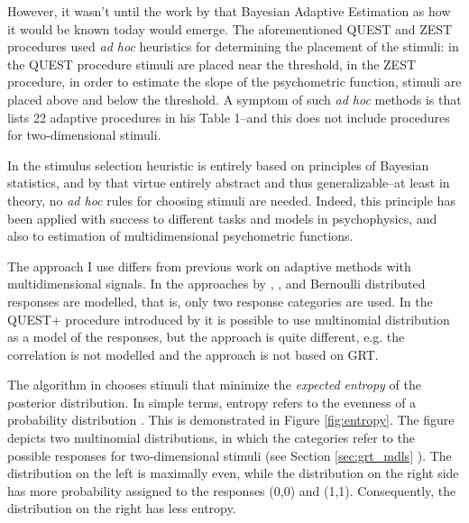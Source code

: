 \documentclass{article}\usepackage{knitr}
\begin{document}
However, it wasn't until the work by \citet{kontsevichtyler1999} that Bayesian Adaptive Estimation as how it would be known today would emerge. The aforementioned QUEST and ZEST procedures used \textit{ad hoc} heuristics for determining the placement of the stimuli: in the QUEST procedure stimuli are placed near the threshold, in the ZEST procedure, in order to estimate the slope of the psychometric function, stimuli are placed above and below the threshold. A symptom of such \textit{ad hoc} methods is that \citet{treutwein1995} lists 22 adaptive procedures in his Table 1--and this does not include procedures for two-dimensional stimuli.

In \citet{kontsevichtyler1999} the stimulus selection heuristic is entirely based on principles of Bayesian statistics, and by that virtue entirely abstract and thus generalizable--at least in theory, no \textit{ad hoc} rules for choosing stimuli are needed. Indeed, this principle has been applied with success to different tasks and models in psychophysics, and also to estimation of multidimensional psychometric functions. 

The approach I use differs from previous work on adaptive methods with multidimensional signals. In the approaches by \citet{dimattina2015}, \citet{lesmes2006}, \citet{shen2013, shen2014} and \citet{kujalalukka2006} Bernoulli distributed responses are modelled, that is, only two response categories are used. In the QUEST+ procedure introduced by \citet{watson2017} it is possible to use multinomial distribution as a model of the responses, but the approach is quite different, e.g. the correlation is not modelled and the approach is not based on GRT.

The algorithm in \citet{kontsevichtyler1999} chooses stimuli that minimize the \textit{expected entropy} of the posterior distribution. In simple terms, entropy refers to the evenness of a probability distribution \citep[p. 365]{kruschke2015}. This is demonstrated in Figure \ref{fig:entropy}. The figure depicts two multinomial distributions, in which the categories refer to the possible responses for two-dimensional stimuli (see Section \ref{sec:grt_mdls} \textit{}). The distribution on the left is maximally even, while the distribution on the right side has more probability assigned to the responses (0,0) and (1,1). Consequently, the distribution on the right has less entropy.
\end{document}
